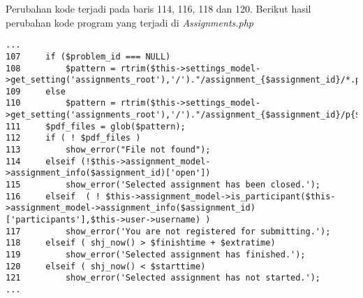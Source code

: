 	Perubahan kode terjadi pada baris 114, 116, 118 dan 120. Berikut hasil perubahan kode program yang terjadi di \textit{Assignments.php}
\begin{lstlisting}[basicstyle=\ttfamily, frame=single,
columns=fullflexible, keepspaces=true, breaklines=true]
...
107		if ($problem_id === NULL)
108			$pattern = rtrim($this->settings_model->get_setting('assignments_root'),'/')."/assignment_{$assignment_id}/*.pdf";
109		else
110			$pattern = rtrim($this->settings_model->get_setting('assignments_root'),'/')."/assignment_{$assignment_id}/p{$problem_id}/*.pdf";
111		$pdf_files = glob($pattern);
112		if ( ! $pdf_files )
113			show_error("File not found");
114		elseif (!$this->assignment_model->assignment_info($assignment_id)['open'])
115			show_error('Selected assignment has been closed.');
116		elseif	( ! $this->assignment_model->is_participant($this->assignment_model->assignment_info($assignment_id)['participants'],$this->user->username) )
117			show_error('You are not registered for submitting.');
118		elseif ( shj_now() > $finishtime + $extratime)
119			show_error('Selected assignment has finished.');
120		elseif ( shj_now() < $starttime)
121			show_error('Selected assignment has not started.');
...
\end{lstlisting}